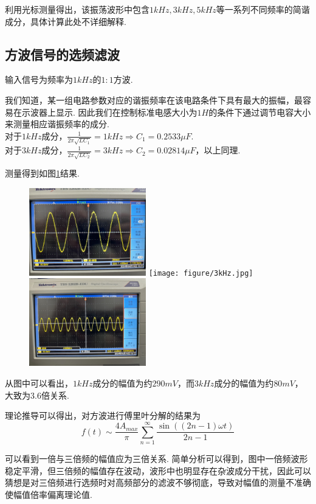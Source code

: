 \documentclass[12pt, a4paper]{ctexart}
\begin{document}
利用光标测量得出，该振荡波形中包含$1kHz, 3kHz, 5kHz$等一系列不同频率的简谐成分，具体计算此处不详细解释.


\subsection{方波信号的选频滤波}
输入信号为频率为$1kHz$的$1:1$方波.

我们知道，某一组电路参数对应的谐振频率在该电路条件下具有最大的振幅，最容易在示波器上显示.
因此我们在控制标准电感大小为$1H$的条件下通过调节电容大小来测量相应谐振频率的成分.\\
对于$1kHz$成分，$\frac{1}{2\pi \sqrt{LC_1}} = 1kHz \Rightarrow C_1 = 0.2533 \mu F$.\\
对于$3kHz$成分，$\frac{1}{2\pi \sqrt{LC_2}} = 3kHz \Rightarrow C_2 = 0.02814 \mu F$，以上同理.

测量得到如图\ref{fig4}结果.
\begin{figure}[htbp]
  \centering
  \includegraphics[width = 2in]{figure/1kHz.jpg}
  \texttt{[image: figure/3kHz.jpg]}
  \includegraphics[width = 2in]{figure/5kHz.jpg}
  \caption{}
  \label{fig4}
\end{figure}

从图中可以看出，$1kHz$成分的幅值为约$290mV$，而$3kHz$成分的幅值为约$80mV$，大致为3.6倍关系.

理论推导可以得出，对方波进行傅里叶分解的结果为
\begin{equation*}
  f(t) \sim \frac{4A_{max}}{\pi} \sum_{n=1}^{\infty} \frac{\sin((2n - 1)\omega t)}{2n - 1}
\end{equation*}

可以看到一倍与三倍频的幅值应为三倍关系.
简单分析可以得到，图中一倍频波形稳定平滑，但三倍频的幅值存在波动，波形中也明显存在杂波成分干扰，因此可以猜想是对三倍频进行选频时对高频部分的滤波不够彻底，导致对幅值的测量不准确使幅值倍率偏离理论值.
\end{document}
